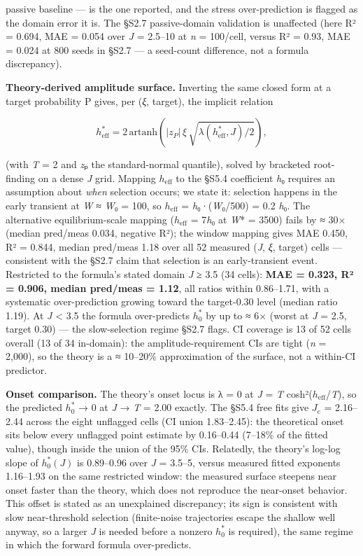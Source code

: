 \documentclass[11pt,letterpaper]{article}
\begin{document}
passive baseline --- is the one reported, and the stress over-prediction is flagged as the domain error it is. The §S2.7 passive-domain validation is unaffected (here R² = 0.694, MAE = 0.054 over \emph{J} = 2.5--10 at \emph{n} = 100/cell, versus R² = 0.93, MAE = 0.024 at 800 seeds in §S2.7 --- a seed-count difference, not a formula discrepancy).

\textbf{Theory-derived amplitude surface.} Inverting the same closed form at a target probability P gives, per (\emph{ξ}, target), the implicit relation

\[
h_{\mathrm{eff}}^{*} = 2\,\mathrm{artanh}\!\left(|z_P|\,\xi\,\sqrt{\lambda(h_{\mathrm{eff}}^{*}, J)/2}\right),
\]

(with \emph{T} = 2 and \emph{z}ₚ the standard-normal quantile), solved by bracketed root-finding on a dense \emph{J} grid. Mapping \(h_{\mathrm{eff}}\) to the §S5.4 coefficient \emph{h}₀ requires an assumption about \emph{when} selection occurs; we state it: selection happens in the early transient at \emph{W} ≈ \emph{W}₀ = 100, so \(h_{\mathrm{eff}}\) = \emph{h}₀·(\emph{W}₀/500) = 0.2 \emph{h}₀. The alternative equilibrium-scale mapping (\(h_{\mathrm{eff}}\) = 7\emph{h}₀ at \emph{W}* = 3500) fails by ≈ 30× (median pred/meas 0.034, negative R²); the window mapping gives MAE 0.450, R² = 0.844, median pred/meas 1.18 over all 52 measured (\emph{J}, \emph{ξ}, target) cells --- consistent with the §S2.7 claim that selection is an early-transient event. Restricted to the formula's stated domain \emph{J} ≥ 3.5 (34 cells): \textbf{MAE = 0.323, R² = 0.906, median pred/meas = 1.12}, all ratios within 0.86--1.71, with a systematic over-prediction growing toward the target-0.30 level (median ratio 1.19). At \emph{J} \textless{} 3.5 the formula over-predicts \(h_0^*\) by up to ≈ 6× (worst at \emph{J} = 2.5, target 0.30) --- the slow-selection regime §S2.7 flags. CI coverage is 13 of 52 cells overall (13 of 34 in-domain): the amplitude-requirement CIs are tight (\emph{n} = 2,000), so the theory is a ≈ 10--20\% approximation of the surface, not a within-CI predictor.

\textbf{Onset comparison.} The theory's onset locus is λ = 0 at \emph{J} = \emph{T} cosh²(\(h_{\mathrm{eff}}\)/\emph{T}), so the predicted \(h_0^*\) → 0 at \emph{J} → \emph{T} = 2.00 exactly. The §S5.4 free fits give \(J_{\mathrm{c}}\) = 2.16--2.44 across the eight unflagged cells (CI union 1.83--2.45): the theoretical onset sits below every unflagged point estimate by 0.16--0.44 (7--18\% of the fitted value), though inside the union of the 95\% CIs. Relatedly, the theory's log-log slope of \(h_0^*(J)\) is 0.89--0.96 over \emph{J} = 3.5--5, versus measured fitted exponents 1.16--1.93 on the same restricted window: the measured surface steepens near onset faster than the theory, which does not reproduce the near-onset behavior. This offset is stated as an unexplained discrepancy; its sign is consistent with slow near-threshold selection (finite-noise trajectories escape the shallow well anyway, so a larger \emph{J} is needed before a nonzero \(h_0^*\) is required), the same regime in which the forward formula over-predicts.
\end{document}
